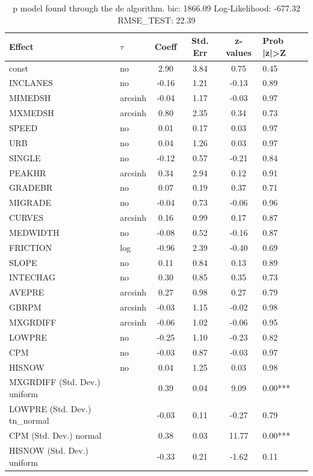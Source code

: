 \begin{table}
	\caption{p model found through the de algorithm. bic: 1866.09 Log-Likelihood: -677.32 RMSE_TEST: 22.39}
	\begin{center}
		\begin{tabular}{|l|l|c|c|c|l|}
			\hline
			Effect & $\tau$ & Coeff & Std. Err & z-values & Prob |z|>Z \\
			\hline
			const & no & 2.90 & 3.84 & 0.75 & 0.45 \\
			\hline
			INCLANES & no & -0.16 & 1.21 & -0.13 & 0.89 \\
			\hline
			MIMEDSH & arcsinh & -0.04 & 1.17 & -0.03 & 0.97 \\
			\hline
			MXMEDSH & arcsinh & 0.80 & 2.35 & 0.34 & 0.73 \\
			\hline
			SPEED & no & 0.01 & 0.17 & 0.03 & 0.97 \\
			\hline
			URB & no & 0.04 & 1.26 & 0.03 & 0.97 \\
			\hline
			SINGLE & no & -0.12 & 0.57 & -0.21 & 0.84 \\
			\hline
			PEAKHR & arcsinh & 0.34 & 2.94 & 0.12 & 0.91 \\
			\hline
			GRADEBR & no & 0.07 & 0.19 & 0.37 & 0.71 \\
			\hline
			MIGRADE & no & -0.04 & 0.73 & -0.06 & 0.96 \\
			\hline
			CURVES & arcsinh & 0.16 & 0.99 & 0.17 & 0.87 \\
			\hline
			MEDWIDTH & no & -0.08 & 0.52 & -0.16 & 0.87 \\
			\hline
			FRICTION & log & -0.96 & 2.39 & -0.40 & 0.69 \\
			\hline
			SLOPE & no & 0.11 & 0.84 & 0.13 & 0.89 \\
			\hline
			INTECHAG & no & 0.30 & 0.85 & 0.35 & 0.73 \\
			\hline
			AVEPRE & arcsinh & 0.27 & 0.98 & 0.27 & 0.79 \\
			\hline
			GBRPM & arcsinh & -0.03 & 1.15 & -0.02 & 0.98 \\
			\hline
			MXGRDIFF & arcsinh & -0.06 & 1.02 & -0.06 & 0.95 \\
			\hline
			LOWPRE & no & -0.25 & 1.10 & -0.23 & 0.82 \\
			\hline
			CPM & no & -0.03 & 0.87 & -0.03 & 0.97 \\
			\hline
			HISNOW & no & 0.04 & 1.25 & 0.03 & 0.98 \\
			\hline
			MXGRDIFF (Std. Dev.) uniform &  & 0.39 & 0.04 & 9.09 & 0.00*** \\
			\hline
			LOWPRE (Std. Dev.) tn_normal &  & -0.03 & 0.11 & -0.27 & 0.79 \\
			\hline
			CPM (Std. Dev.) normal &  & 0.38 & 0.03 & 11.77 & 0.00*** \\
			\hline
			HISNOW (Std. Dev.) uniform &  & -0.33 & 0.21 & -1.62 & 0.11 \\
			\hline
		\end{tabular}
	\end{center}
\end{table}